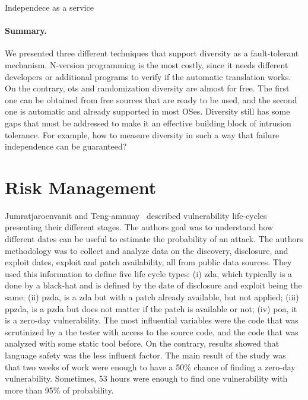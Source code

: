 Independece as a service~\cite{Zhai:2014}


\paragraph{Summary.}
We presented three different techniques that support diversity as a fault-tolerant mechanism. 
N-version programming is the most costly, since it needs different developers or additional programs to verify if the automatic translation works. 
On the contrary, \gls{ots} and randomization diversity are almost for free. 
The first one can be obtained from free sources that are ready to be used, and the second one is automatic and already supported
in most OSes. 
Diversity still has some gaps that must be addressed to make it an effective building block of intrusion tolerance. 
For example, how to measure diversity in such a way that failure independence can be guaranteed?



\section{Risk Management}



Jumratjaroenvanit and Teng-amnuay~\cite{Jumratjaroenvanit:2008} described vulnerability life-cycles presenting their different stages. 
The authors goal was to understand how different dates can be useful to estimate the probability of an attack. 
The authors methodology was to collect and analyze data on the discovery, disclosure, and exploit dates, exploit and patch availability, all from public data sources. 
They used this information to define five life cycle types: (i) \gls{zda}, which typically is a done by a black-hat and is defined by the date of disclosure and exploit being the same; (ii) \gls{pzda}, is a \gls{zda} but with a patch already available, but not applied; 
(iii) \gls{ppzda}, is a \gls{pzda} but does not matter if the patch is available or not; 
(iv) \gls{poa}, it is a zero-day vulnerability. 
The most influential variables were the code that was scrutinized by a the tester with access to the source code, and the code that was analyzed with some static tool before. 
On the contrary, results showed that language safety was the less influent factor. 
The main result of the study was that two weeks of work were enough to have a 50\% chance of finding a zero-day vulnerability. 
Sometimes, 53 hours were enough to find one vulnerability with more than 95\% of probability.


